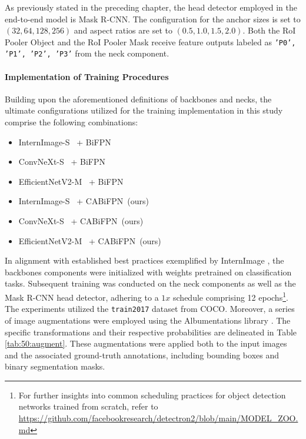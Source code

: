 As previously stated in the preceding chapter, the head detector employed in the end-to-end model is Mask R-CNN. The configuration for the anchor sizes is set to \((32, 64, 128, 256)\) and aspect ratios are set to \((0.5, 1.0, 1.5, 2.0)\). Both the RoI Pooler Object and the RoI Pooler Mask receive feature outputs labeled as \texttt{'P0', 'P1', 'P2', 'P3'} from the neck component.


\paragraph{Implementation of Training Procedures}
Building upon the aforementioned definitions of backbones and necks, the ultimate configurations utilized for the training implementation in this study comprise the following combinations:
\begin{itemize}
    \item InternImage-S~\cite{wang2023internimage} + BiFPN~\cite{tan2020efficientdet}
    \item ConvNeXt-S~\cite{liu2022convnet} + BiFPN~\cite{tan2020efficientdet}
    \item EfficientNetV2-M~\cite{tan2021efficientnetv2} + BiFPN~\cite{tan2020efficientdet}
    \item InternImage-S~\cite{wang2023internimage} + CABiFPN~(ours)
    \item ConvNeXt-S~\cite{liu2022convnet} + CABiFPN~(ours)
    \item EfficientNetV2-M~\cite{tan2021efficientnetv2} + CABiFPN~(ours)
\end{itemize}

In alignment with established best practices exemplified by InternImage \cite{wang2023internimage}, the backbones components were initialized with weights pretrained on classification tasks. Subsequent training was conducted on the neck components as well as the Mask R-CNN head detector, adhering to a $1x$ schedule comprising 12 epochs\footnote{For further insights into common scheduling practices for object detection networks trained from scratch, refer to \url{https://github.com/facebookresearch/detectron2/blob/main/MODEL_ZOO.md}}.\\

The experiments utilized the \texttt{train2017} dataset from COCO. Moreover, a series of image augmentations were employed using the Albumentations library \cite{info11020125}. The specific transformations and their respective probabilities are delineated in Table \ref{tab:50:augment}. These augmentations were applied both to the input images and the associated ground-truth annotations, including bounding boxes and binary segmentation masks.\\

